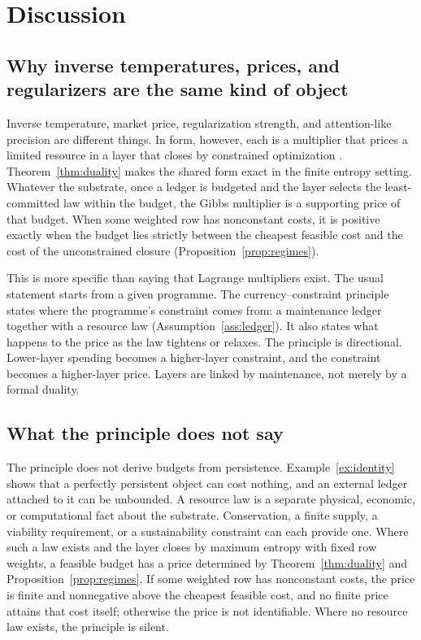 \section{Discussion}\label{sec:discussion}

\subsection{Why inverse temperatures, prices, and regularizers are the same kind of object}

Inverse temperature, market price, regularization strength, and attention-like precision are different things. In form, however, each is a multiplier that prices a limited resource in a layer that closes by constrained optimization \cite{jaynes1957information,arrowdebreu1954,sims2003rationalinattention}. Theorem~\ref{thm:duality} makes the shared form exact in the finite entropy setting. Whatever the substrate, once a ledger is budgeted and the layer selects the least-committed law within the budget, the Gibbs multiplier is a supporting price of that budget. When some weighted row has nonconstant costs, it is positive exactly when the budget lies strictly between the cheapest feasible cost and the cost of the unconstrained closure (Proposition~\ref{prop:regimes}).

This is more specific than saying that Lagrange multipliers exist. The usual statement starts from a given programme. The currency--constraint principle states where the programme's constraint comes from: a maintenance ledger together with a resource law (Assumption~\ref{ass:ledger}). It also states what happens to the price as the law tightens or relaxes. The principle is directional. Lower-layer spending becomes a higher-layer constraint, and the constraint becomes a higher-layer price. Layers are linked by maintenance, not merely by a formal duality.

\subsection{What the principle does not say}

The principle does not derive budgets from persistence. Example~\ref{ex:identity} shows that a perfectly persistent object can cost nothing, and an external ledger attached to it can be unbounded. A resource law is a separate physical, economic, or computational fact about the substrate. Conservation, a finite supply, a viability requirement, or a sustainability constraint can each provide one. Where such a law exists and the layer closes by maximum entropy with fixed row weights, a feasible budget has a price determined by Theorem~\ref{thm:duality} and Proposition~\ref{prop:regimes}. If some weighted row has nonconstant costs, the price is finite and nonnegative above the cheapest feasible cost, and no finite price attains that cost itself; otherwise the price is not identifiable. Where no resource law exists, the principle is silent.

